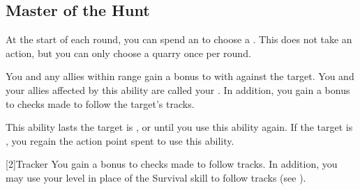         \subsection{Master of the Hunt}

            \label{Quarry}
            At the start of each round, you can spend an  to choose a .
            This does not take an action, but you can only choose a quarry once per round.
            \begin{ability}
                \begin{spelltargetinginfo}
                \end{spelltargetinginfo}
                \begin{spelleffects}
                    \spelleffect You and any allies within range gain a  bonus to  with  against the target.
                    You and your allies affected by this ability are called your .
                    In addition, you gain a  bonus to checks made to follow the target's tracks.

                    This ability lasts the target is , or until you use this ability again.
                    If the target is , you regain the action point spent to use this ability.
                \end{spelleffects}
            \end{ability}

            [2]{Tracker}
            You gain a  bonus to checks made to follow tracks.
            In addition, you may use your level in place of the Survival skill to follow tracks (see ).

